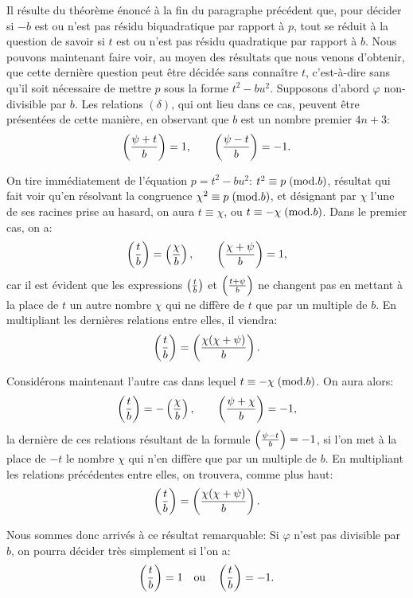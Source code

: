 \par\noindent
Il résulte du théorème énoncé à la fin du paragraphe précédent que, pour décider si $-b$ est ou
n'est pas résidu biquadratique par rapport à $p$, tout se réduit à la question de savoir si $t$
est ou n'est pas résidu quadratique par rapport à $b$. Nous pouvons maintenant faire voir, au
moyen des résultats que nous venons d'obtenir, que cette dernière question peut être décidée sans
connaître $t$, c'est-à-dire sans qu'il soit nécessaire de mettre $p$ sous la forme $t^2-bu^2$.
Supposons d'abord $\varphi$ non-divisible par $b$. Les relations $(\delta)$, qui ont lieu dans ce
cas, peuvent être présentées de cette manière, en observant que $b$ est un nombre premier $4n+3$:
\[
\left(\frac{\psi+t}{b}\right)=1,\qquad \left(\frac{\psi-t}{b}\right)=-1.
\]
\par\noindent
On tire immédiatement de l'équation $p=t^2-bu^2$: $t^2\equiv p\;(\mathrm{mod}.b)$, résultat qui fait voir
qu'en résolvant la congruence $\chi^2\equiv p\;(\mathrm{mod}.b)$, et désignant par $\chi$ l'une de ses racines
prise au hasard, on aura $t\equiv\chi$, ou $t\equiv-\chi\;(\mathrm{mod}.b)$. Dans le premier cas, on a:
\[
\left(\frac{t}{b}\right)=\left(\frac{\chi}{b}\right),\qquad \left(\frac{\chi+\psi}{b}\right)=1,
\]
car il est évident que les expressions $\left(\frac{t}{b}\right)$ et $\left(\frac{t+\psi}{b}\right)$ ne changent pas en
mettant à la place de $t$ un autre nombre $\chi$ qui ne diffère de $t$ que par un multiple de $b$.
En multipliant les dernières relations entre elles, il viendra:
\[
\left(\frac{t}{b}\right)=\left(\frac{\chi(\chi+\psi)}{b}\right).
\]
\par\noindent
Considérons maintenant l'autre cas dans lequel $t\equiv-\chi\;(\mathrm{mod}.b)$. On aura alors:
\[
\left(\frac{t}{b}\right)=-\left(\frac{\chi}{b}\right),\qquad \left(\frac{\psi+\chi}{b}\right)=-1,
\]
la dernière de ces relations résultant de la formule $\left(\frac{\psi-t}{b}\right)=-1$, si l'on met à la place
de $-t$ le nombre $\chi$ qui n'en diffère que par un multiple de $b$. En multipliant les relations
précédentes entre elles, on trouvera, comme plus haut:
\[
\left(\frac{t}{b}\right)=\left(\frac{\chi(\chi+\psi)}{b}\right).
\]
\par\noindent
Nous sommes donc arrivés à ce résultat remarquable: Si $\varphi$ n'est pas divisible par $b$, on
pourra décider très simplement si l'on a:
\[
\left(\frac{t}{b}\right)=1\quad\hbox{ou}\quad \left(\frac{t}{b}\right)=-1.
\]
